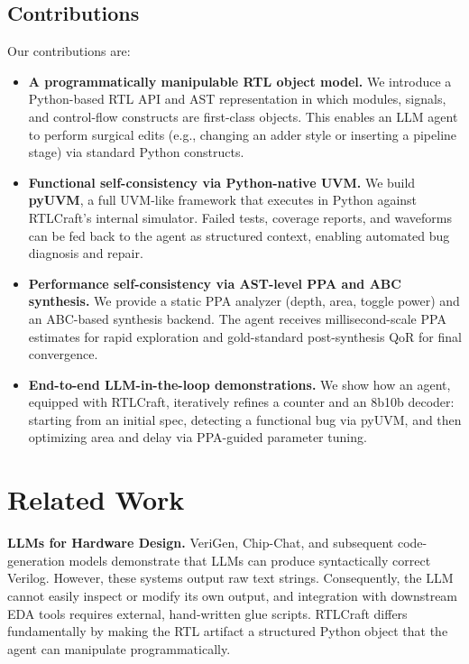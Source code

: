 \documentclass[11pt]{article}
\begin{document}
\subsection{Contributions}

Our contributions are:
\begin{itemize}
    \item \textbf{A programmatically manipulable RTL object model.} We introduce a Python-based RTL API and AST representation in which modules, signals, and control-flow constructs are first-class objects. This enables an LLM agent to perform surgical edits (e.g., changing an adder style or inserting a pipeline stage) via standard Python constructs.
    \item \textbf{Functional self-consistency via Python-native UVM.} We build \textbf{pyUVM}, a full UVM-like framework that executes in Python against RTLCraft's internal simulator. Failed tests, coverage reports, and waveforms can be fed back to the agent as structured context, enabling automated bug diagnosis and repair.
    \item \textbf{Performance self-consistency via AST-level PPA and ABC synthesis.} We provide a static PPA analyzer (depth, area, toggle power) and an ABC-based synthesis backend. The agent receives millisecond-scale PPA estimates for rapid exploration and gold-standard post-synthesis QoR for final convergence.
    \item \textbf{End-to-end LLM-in-the-loop demonstrations.} We show how an agent, equipped with RTLCraft, iteratively refines a counter and an 8b10b decoder: starting from an initial spec, detecting a functional bug via pyUVM, and then optimizing area and delay via PPA-guided parameter tuning.
\end{itemize}

\section{Related Work}
\label{sec:related}

\textbf{LLMs for Hardware Design.} VeriGen\cite{thakur2023verigen}, Chip-Chat\cite{blocklove2023chipchat}, and subsequent code-generation models demonstrate that LLMs can produce syntactically correct Verilog. However, these systems output raw text strings. Consequently, the LLM cannot easily inspect or modify its own output, and integration with downstream EDA tools requires external, hand-written glue scripts. RTLCraft differs fundamentally by making the RTL artifact a structured Python object that the agent can manipulate programmatically.
\end{document}
